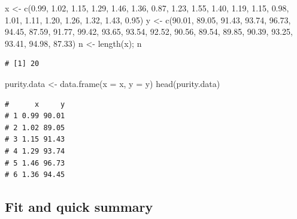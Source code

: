 \documentclass[
  letterpaper,
  DIV=11,
  numbers=noendperiod]{scrreprt}
\newenvironment{Shaded}{\begin{snugshade}}{\end{snugshade}}
\newcommand{\AttributeTok}[1]{\textcolor[rgb]{0.40,0.45,0.13}{#1}}
\newcommand{\FloatTok}[1]{\textcolor[rgb]{0.68,0.00,0.00}{#1}}
\newcommand{\FunctionTok}[1]{\textcolor[rgb]{0.28,0.35,0.67}{#1}}
\newcommand{\NormalTok}[1]{\textcolor[rgb]{0.00,0.23,0.31}{#1}}
\newcommand{\OtherTok}[1]{\textcolor[rgb]{0.00,0.23,0.31}{#1}}
\begin{document}
\begin{Shaded}
\begin{Highlighting}[]
\NormalTok{x }\OtherTok{\textless{}{-}} \FunctionTok{c}\NormalTok{(}\FloatTok{0.99}\NormalTok{, }\FloatTok{1.02}\NormalTok{, }\FloatTok{1.15}\NormalTok{, }\FloatTok{1.29}\NormalTok{, }\FloatTok{1.46}\NormalTok{, }\FloatTok{1.36}\NormalTok{, }\FloatTok{0.87}\NormalTok{, }\FloatTok{1.23}\NormalTok{, }\FloatTok{1.55}\NormalTok{, }\FloatTok{1.40}\NormalTok{, }\FloatTok{1.19}\NormalTok{,}
       \FloatTok{1.15}\NormalTok{, }\FloatTok{0.98}\NormalTok{, }\FloatTok{1.01}\NormalTok{, }\FloatTok{1.11}\NormalTok{, }\FloatTok{1.20}\NormalTok{, }\FloatTok{1.26}\NormalTok{, }\FloatTok{1.32}\NormalTok{, }\FloatTok{1.43}\NormalTok{, }\FloatTok{0.95}\NormalTok{)}
\NormalTok{y }\OtherTok{\textless{}{-}} \FunctionTok{c}\NormalTok{(}\FloatTok{90.01}\NormalTok{, }\FloatTok{89.05}\NormalTok{, }\FloatTok{91.43}\NormalTok{, }\FloatTok{93.74}\NormalTok{, }\FloatTok{96.73}\NormalTok{, }\FloatTok{94.45}\NormalTok{, }\FloatTok{87.59}\NormalTok{, }\FloatTok{91.77}\NormalTok{, }\FloatTok{99.42}\NormalTok{, }\FloatTok{93.65}\NormalTok{,}
       \FloatTok{93.54}\NormalTok{, }\FloatTok{92.52}\NormalTok{, }\FloatTok{90.56}\NormalTok{, }\FloatTok{89.54}\NormalTok{, }\FloatTok{89.85}\NormalTok{, }\FloatTok{90.39}\NormalTok{, }\FloatTok{93.25}\NormalTok{, }\FloatTok{93.41}\NormalTok{, }\FloatTok{94.98}\NormalTok{, }\FloatTok{87.33}\NormalTok{)}
\NormalTok{n }\OtherTok{\textless{}{-}} \FunctionTok{length}\NormalTok{(x); n}
\end{Highlighting}
\end{Shaded}

\begin{verbatim}
# [1] 20
\end{verbatim}

\begin{Shaded}
\begin{Highlighting}[]
\NormalTok{purity.data }\OtherTok{\textless{}{-}} \FunctionTok{data.frame}\NormalTok{(}\AttributeTok{x =}\NormalTok{ x, }\AttributeTok{y =}\NormalTok{ y)}
\FunctionTok{head}\NormalTok{(purity.data)}
\end{Highlighting}
\end{Shaded}

\begin{verbatim}
#      x     y
# 1 0.99 90.01
# 2 1.02 89.05
# 3 1.15 91.43
# 4 1.29 93.74
# 5 1.46 96.73
# 6 1.36 94.45
\end{verbatim}

\subsection{Fit and quick summary}\label{fit-and-quick-summary}
\end{document}
